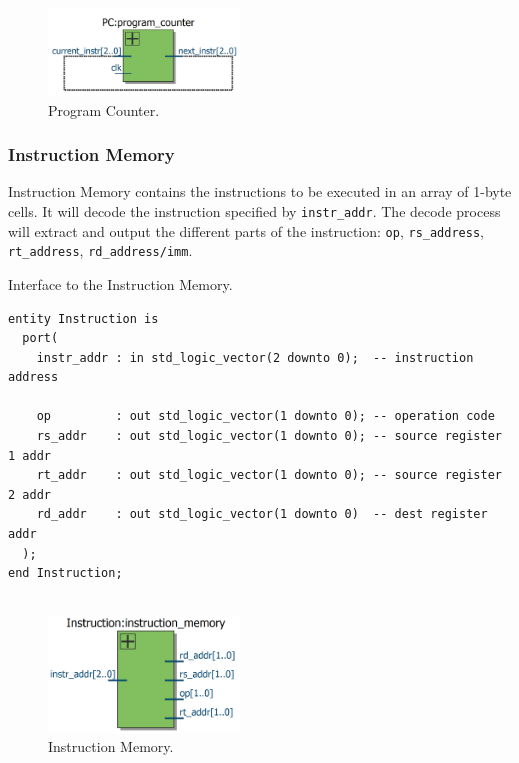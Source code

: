 \documentclass[a4paper, 11pt,oneside]{article}
\begin{document}
\begin{figure}[H]
	\begin{center}
	\includegraphics[width=2in]{pc.png}
	\caption{Program Counter.}
	\label{fig:pc} 
	\end{center}
\end{figure}

\subsubsection{Instruction Memory}
Instruction Memory contains the instructions to be executed in an array of 
1-byte cells. It will decode the instruction specified by 
\texttt{instr_addr}. The decode process will extract and output the 
different parts of the instruction: \texttt{op}, 
\texttt{rs_address}, \texttt{rt_address}, 
\texttt{rd_address/imm}.

\begin{listing}[H]
\caption{Interface to the Instruction Memory.}
\label{code:im}
\begin{verbatim}
entity Instruction is
  port(
    instr_addr : in std_logic_vector(2 downto 0);  -- instruction address

    op         : out std_logic_vector(1 downto 0); -- operation code
    rs_addr    : out std_logic_vector(1 downto 0); -- source register 1 addr    
    rt_addr    : out std_logic_vector(1 downto 0); -- source register 2 addr
    rd_addr    : out std_logic_vector(1 downto 0)  -- dest register addr
  );
end Instruction;


\end{verbatim}
\end{listing}

\begin{figure}[H]
	\begin{center}
	\includegraphics[width=2in]{im.png}
	\caption{Instruction Memory.}
	\label{fig:im} 
	\end{center}
\end{figure}
\end{document}
